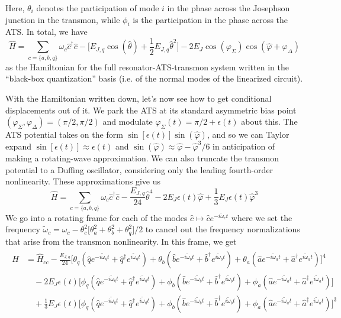 Here, $\theta_i$ denotes the participation of mode $i$ in the phase across the Josephson junction in the transmon, while $\phi_i$ is the participation in the phase across the ATS. In total, we have
\begin{equation}
\hat{H} = \sum_{c = \{a, b, q\}}\omega_c \hat{c}^\dagger\hat{c} - \Big[E_{J,q}\cos(\hat{\theta}) + \frac{1}{2}E_{J,q} \hat{\theta}^2\Big] - 2E_J \cos(\varphi_\Sigma)\cos(\hat{\varphi} + \varphi_\Delta)
\end{equation}
as the Hamiltonian for the full resonator-ATS-transmon system written in the ``black-box quantization'' basis (i.e. of the normal modes of the linearized circuit). 

With the Hamiltonian written down, let's now see how to get conditional displacements out of it. We park the ATS at its standard asymmetric bias point $(\varphi_\Sigma, \varphi_\Delta) = (\pi/2, \pi/2)$ and modulate $\varphi_\Sigma(t) = \pi/2 + \epsilon(t)$ about this. The ATS potential takes on the form $\sin[\epsilon(t)]\sin(\hat{\varphi})$, and so we can Taylor expand $\sin[\epsilon(t)] \approx \epsilon(t)$ and $\sin(\hat{\varphi}) \approx \hat{\varphi} - \hat{\varphi}^3/6$ in anticipation of making a rotating-wave approximation. We can also truncate the transmon potential to a Duffing oscillator, considering only the leading fourth-order nonlinearity. These approximations give us
\begin{equation}
\hat{H} = \sum_{c = \{a, b, q\}}\omega_c \hat{c}^\dagger\hat{c} - \frac{E_{J,q}}{24}\hat{\theta}^4 - 2E_J \epsilon(t)\hat{\varphi} + \frac{1}{3}E_J\epsilon(t)\hat{\varphi}^3
\end{equation}
We go into a rotating frame for each of the modes $\hat{c} \mapsto \hat{c} e^{-i\tilde{\omega}_c t}$ where we set the frequency $\widetilde{\omega}_c = \omega_c - \theta_{c}^{2} \big[\theta_{a}^{2} + \theta_{b}^{2} + \theta_{q}^{2}\big]/2$ to cancel out the frequency normalizations that arise from the transmon nonlinearity. In this frame, we get
\begin{align}
\begin{split}
\hat{H} &= \hat{H}_{cc} - \frac{E_{J,q}}{24}\Big[\theta_q(\hat{q}e^{-i\tilde{\omega}_q t} + \hat{q}^\dagger e^{i\tilde{\omega}_q t}) + \theta_b(\hat{b}e^{-i\tilde{\omega}_b t} + \hat{b}^\dagger e^{i\tilde{\omega}_b t}) + \theta_a(\hat{a}e^{-i\tilde{\omega}_a t} + \hat{a}^\dagger e^{i\tilde{\omega}_a t})\Big]^4 \\&\quad- 2E_J\epsilon(t)\Big[\phi_q(\hat{q}e^{-i\tilde{\omega}_q t} + \hat{q}^\dagger e^{i\tilde{\omega}_q t}) + \phi_b(\hat{b}e^{-i\tilde{\omega}_b t} + \hat{b}^\dagger e^{i\tilde{\omega}_b t}) + \phi_a(\hat{a}e^{-i\tilde{\omega}_a t} + \hat{a}^\dagger e^{i\tilde{\omega}_a t})\Big]\\ &\quad + \frac{1}{3}E_J\epsilon(t)\Big[\phi_q(\hat{q}e^{-i\tilde{\omega}_q t} + \hat{q}^\dagger e^{i\tilde{\omega}_q t}) + \phi_b(\hat{b}e^{-i\tilde{\omega}_b t} + \hat{b}^\dagger e^{i\tilde{\omega}_b t}) + \phi_a(\hat{a}e^{-i\tilde{\omega}_a t} + \hat{a}^\dagger e^{i\tilde{\omega}_a t})\Big]^3
\end{split}
\end{align}
